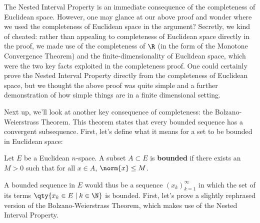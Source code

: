The Nested Interval Property is an immediate consequence of the completeness of Euclidean space. However, one may glance at our above proof and wonder where we used the completeness of Euclidean space in the argument? Secretly, we kind of cheated: rather than appealing to completeness of Euclidean space directly in the proof, we made use of the completeness of \( \R \) (in the form of the Monotone Convergence Theorem) and the finite-dimensionality of Euclidean space, which were the two key facts exploited in the completeness proof. One could certainly prove the Nested Interval Property directly from the completeness of Euclidean space, but we thought the above proof was quite simple and a further demonstration of how simple things are in a finite dimensional setting.

\vspace{3mm}

Next up, we'll look at another key consequence of completeness: the Bolzano-Weierstrass Theorem. This theorem states that every bounded sequence has a convergent subsequence. First, let's define what it means for a set to be bounded in Euclidean space:

\begin{definition}
  Let \( E \) be a Euclidean \( n \)-space. A subset \( A\subset E \) is \textbf{bounded} if there exists an \( M>0 \) such that for all \( x\in A \), \( \norm{x}\leq M \).
\end{definition}

A bounded sequence in \( E \) would thus be a sequence \((x_k)_{k=1}^\infty  \) in which the set of its terms \( \qty{x_k\in E\mid k\in\N} \) is bounded. First, let's prove a slightly rephrased version of the Bolzano-Weierstrass Theorem, which makes use of the Nested Interval Property.

